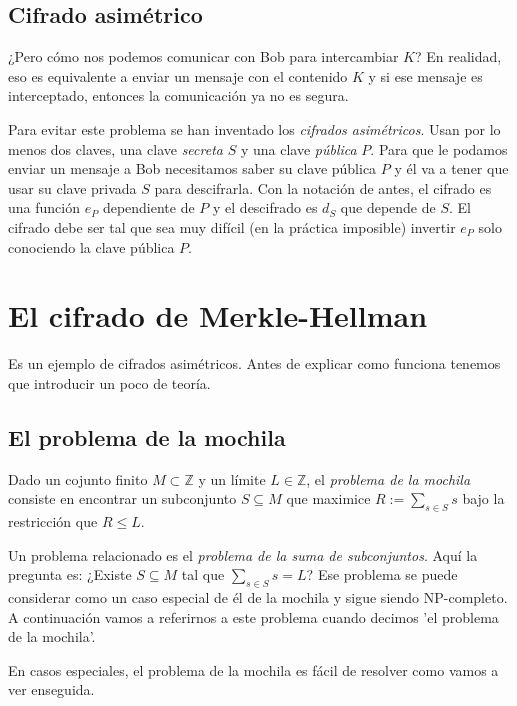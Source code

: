 \documentclass[12pt]{article}
\newcommand{\Z}{\mathbb{Z}}
\begin{document}
\subsection*{Cifrado asimétrico}

¿Pero cómo nos podemos comunicar con Bob para intercambiar $K$? En realidad, eso es equivalente a enviar un mensaje con el contenido $K$ y si ese mensaje es interceptado, entonces la comunicación ya no es segura.

Para evitar este problema se han inventado los \emph{cifrados asimétricos}. Usan por lo menos dos claves, una clave \emph{secreta} $S$ y una clave \emph{pública} $P$. Para que le podamos enviar un mensaje a Bob necesitamos saber su clave pública $P$ y él va a tener que usar su clave privada $S$ para descifrarla. Con la notación de antes, el cifrado es una función $e_P$ dependiente de $P$ y el descifrado es $d_S$ que depende de $S$. El cifrado debe ser tal que sea muy difícil (en la práctica imposible) invertir $e_P$ solo conociendo la clave pública $P$.

\section{El cifrado de Merkle-Hellman}

Es un ejemplo de cifrados asimétricos. Antes de explicar como funciona tenemos que introducir un poco de teoría.

\subsection*{El problema de la mochila}

Dado un cojunto finito $M \subset \Z$ y un límite $L \in \Z$, el \emph{problema de la mochila} consiste en encontrar un subconjunto $S \subseteq M$ que maximice $R := \sum_{s \in S}s$ bajo la restricción que $R \leq L$.

Un problema relacionado es el \emph{problema de la suma de subconjuntos}. Aquí la pregunta es: ¿Existe $S \subseteq M$ tal que $\sum_{s \in S}s = L$? Ese problema se puede considerar como un caso especial de él de la mochila y sigue siendo NP-completo. A continuación vamos a referirnos a este problema cuando decimos 'el problema de la mochila'.

En casos especiales, el problema de la mochila es fácil de resolver como vamos a ver enseguida.
\end{document}

